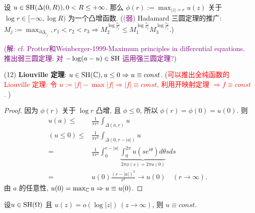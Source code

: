 \begin{exercise}
  设 $u \in \operatorname{SH}(\Delta (0,R)), 0<R \leq +\infty $. 
  那么 $\phi (r):=\max_{|z|=r} u(z)$ 关于 $\log r \in [-\infty , \log R)$ 为一个凸增函数. (\textcolor{purple}{(弱)} Hadamard 三圆定理的推广: $M_j:=\max_{\partial \Delta _{r_j}}, r_1<r_2<r_3 \Rightarrow M_2^{\log \frac{r_3}{r_1}}\leq M_1^{\log \frac{r_3}{r_2}} M_3^{\log \frac{r_2}{r_1}}$.)   

  \noindent \textcolor{purple}{(解: cf. Protter和Weinberger-1999-Maximum principles in differential equations. 推出弱三圆定理: 对 $-\log(a-u) \in \operatorname{SH}$ 运用强三圆定理?) }
\end{exercise}

\noindent (12) \textbf{Liouville 定理}: 
 $u \in \operatorname{SH}({\mathbb C}), u \leq 0 \Rightarrow u \equiv const$. (\textcolor{red}{可以推出全纯函数的Liouville 定理: 令 $u:=|f|-\max|f| \Rightarrow |f| \equiv const$, 利用开映射定理 $\Rightarrow f \equiv const$. }) 
\begin{proof}
  因为 $\phi (r)$ 关于 $\log r$ 凸增, 且 $\phi \leq 0$, 所以 $\phi (r)=\phi (0)=u(0)$. 则
  $$ \begin{aligned}
    u(a) \leq & \frac{1}{\pi r^2} \int_{\Delta (a,r)} u\\
    (u \leq 0) \leq & \frac{1}{\pi r^2} \int_{\Delta (0, r-|a|)} u\\
    =& \frac{1}{\pi r^2} \int_{0}^{r-|a|} \underbrace{\int_{0}^{2 \pi } u(s e^{i \theta }) d \theta}_{2 \pi  \phi (s)=2 \pi u(0)} s ds\\
    =& u(0) \frac{(r-|a|)^2}{r^2} \to u(0) \quad (r \to \infty ).
  \end{aligned}  $$     
  由 $a$ 的任意性, $u(0) = \max_{{\mathbb C}}u \Rightarrow u \equiv u(0)$.  
\end{proof}

\begin{exercise}
  设$u \in \operatorname{SH}(\Omega )$ 且 $u(z)=o(\log|z|)~ (z \to \infty )$, 则 $u \equiv const$.   
\end{exercise}

